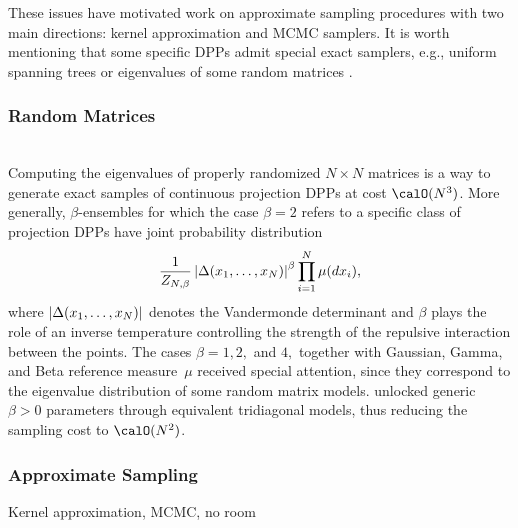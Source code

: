 \documentclass[twoside,11pt]{article}
\begin{document}
      These issues have motivated work on approximate sampling procedures with two main directions: kernel approximation and MCMC samplers.
      It is worth mentioning that some specific DPPs admit special exact samplers, e.g., uniform spanning trees \citep{PrWi98} or eigenvalues of some random matrices \citep{DuEd02}.


    \subsubsection{Random Matrices} %
    \label{ssub:random_matrices}

      \\
      Computing the eigenvalues of properly randomized $N\times N$ matrices is a way to generate exact samples of continuous projection DPPs at cost $\calO(N^3)$.
      More generally, $\beta$-ensembles for which the case $\beta=2$ refers to a specific class of projection DPPs \citep{Kon05} have joint probability distribution
      \begin{equation*}
        \frac{1}{Z_{N,\beta}}
        \left| \Delta(x_1,\dots,x_N) \right|^{\beta}
        \prod_{i= 1}^N
          \mu(d x_i),
      \end{equation*}
      where $\left| \Delta(x_1,\dots,x_N) \right|$ denotes the Vandermonde determinant and $\beta$ plays the role of an inverse temperature controlling the strength of the repulsive interaction between the points.
      The cases $\beta=1, 2,$ and $4,$ together with Gaussian, Gamma, and Beta reference measure~$\mu$ received special attention, since they correspond to the eigenvalue distribution of some random matrix models.
      \citet{DuEd02} unlocked generic $\beta>0$ parameters through equivalent tridiagonal models, thus reducing the sampling cost to $\calO(N^2)$.


    \subsubsection{Approximate Sampling} %
    \label{ssub:approximate_sampling}

      Kernel approximation, MCMC, no room


\end{document}
